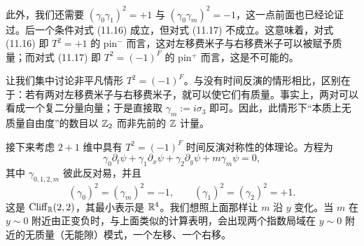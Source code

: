 此外，我们还需要 $(\gamma_0\gamma_1)^2=+1$ 与 $(\gamma_0\gamma_m)^2=-1$，这一点前面也已经论证过。后一个条件对式 (11.16) 成立，但对式 (11.17) 不成立。这意味着，对式 (11.16) 即 $T^2=+1$ 的 pin$^-$ 而言，这对左移费米子与右移费米子可以被赋予质量；而对式 (11.17) 即 $T^2=(-1)^F$ 的 pin$^+$ 而言，这是不可能的。

让我们集中讨论非平凡情形 $T^2=(-1)^F$。与没有时间反演的情形相比，区别在于：若有两对左移费米子与右移费米子，就可以使它们有质量。事实上，两对可以看成一个复二分量向量；于是直接取 $\gamma_m:=i\sigma_3$ 即可。因此，此情形下“本质上无质量自由度”的数目以 $\mathbb{Z}_2$ 而非先前的 $\mathbb{Z}$ 计量。

接下来考虑 $2+1$ 维中具有 $T^2=(-1)^F$ 时间反演对称性的体理论。方程为
\begin{equation}
\gamma_0\partial_t\psi+\gamma_1\partial_x\psi+\gamma_2\partial_y\psi+m\gamma_m\psi=0, \tag{11.20}
\end{equation}
其中 $\gamma_{0,1,2,m}$ 彼此反对易，并且
\begin{equation}
(\gamma_0)^2=(\gamma_m)^2=-1,\qquad (\gamma_1)^2=(\gamma_2)^2=+1. \tag{11.21}
\end{equation}
这是 $\mathrm{Cliff}_{\mathbb{R}}(2,2)$，其最小表示是 $\mathbb{R}^4$。我们想照上面那样让 $m$ 沿 $y$ 变化。当 $m$ 在 $y\sim0$ 附近由正变负时，与上面类似的计算表明，会出现两个指数局域在 $y\sim0$ 附近的无质量（无能隙）模式，一个左移、一个右移。

